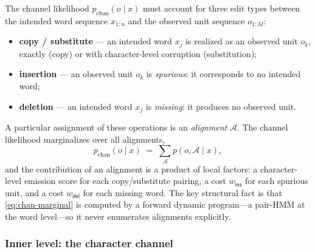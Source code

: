 \documentclass[11pt]{article}
\providecommand{\given}{\mid}
\providecommand{\insact}{\textsf{ins}}
\providecommand{\delact}{\textsf{del}}
\providecommand{\wdel}{w_{\delact}}
\providecommand{\wins}{w_{\insact}}
\begin{document}
The channel likelihood $p_{\mathrm{chan}}(o \given x)$ must account for three edit types between the intended word sequence $x_{1:n}$ and the observed unit sequence $o_{1:M}$:
\begin{itemize}[leftmargin=1.6em,itemsep=1pt]
\item \textbf{copy / substitute} --- an intended word $x_j$ is realized as an observed unit $o_k$, exactly (copy) or with character-level corruption (substitution);
\item \textbf{insertion} --- an observed unit $o_k$ is \emph{spurious}: it corresponds to no intended word;
\item \textbf{deletion} --- an intended word $x_j$ is \emph{missing}: it produces no observed unit.
\end{itemize}
A particular assignment of these operations is an \emph{alignment} $\mathcal A$. The channel likelihood marginalizes over all alignments,
\begin{equation}\label{eq:chan-marginal}
  p_{\mathrm{chan}}(o \given x) \;=\; \sum_{\mathcal A} p(o, \mathcal A \given x),
\end{equation}
and the contribution of an alignment is a product of local factors: a character-level emission score for each copy/substitute pairing, a cost $\wins$ for each spurious unit, and a cost $\wdel$ for each missing word. The key structural fact is that \eqref{eq:chan-marginal} is computed by a forward dynamic program---a pair-HMM at the word level---so it never enumerates alignments explicitly.

\subsubsection{Inner level: the character channel}
\label{sec:char-channel}
\end{document}
